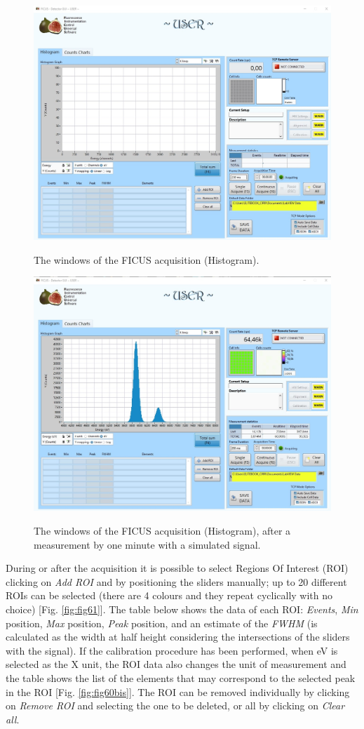 \documentclass[a4paper,12pt,oneside,pdflatex,italian,final,twocolumn]{article}
\begin{document}
\clearpage

\begin{figure}[h!]
\centering
{\includegraphics[width=.8\textwidth]{Cattura112.jpg}} \quad
\caption{The windows of the FICUS acquisition (Histogram).}\label{fig:fig59}
\end{figure}

\begin{figure}[h!]
\centering
{\includegraphics[width=.8\textwidth]{Cattura113.jpg}} \quad
\caption{The windows of the FICUS acquisition (Histogram), after a measurement by one minute with a simulated signal.}\label{fig:fig60}
\end{figure}

\clearpage


During or after the acquisition it is possible to select Regions Of Interest (ROI) clicking on \textit{Add ROI} and by positioning the sliders manually; up to 20 different ROIs can be selected (there are 4 colours and they repeat cyclically with no choice) [Fig. \ref{fig:fig61}]. 
The table below shows the data of each ROI: \textit{Events}, \textit{Min} position, \textit{Max} position, \textit{Peak} position, and an estimate of the \textit{FWHM} (is calculated as the width at half height considering the intersections of the sliders with the signal). 
If the calibration procedure has been performed, when eV is selected as the X unit, the ROI data also changes the unit of measurement and the table shows the list of the elements that may correspond to the selected peak in the ROI [Fig. \ref{fig:fig60bis}].
The ROI can be removed individually by clicking on \textit{Remove ROI} and selecting the one to be deleted, or all by clicking on \textit{Clear all}.
\end{document}
